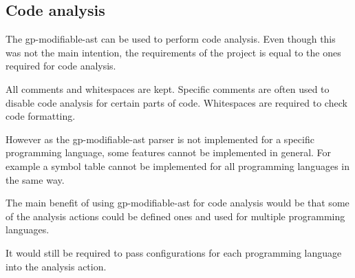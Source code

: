 \subsection{Code analysis}

The gp-modifiable-ast can be used to perform code analysis. Even though this was not the main
intention, the requirements of the project is equal to the ones required for code analysis.

All comments and whitespaces are kept. 
Specific comments are often used to disable code analysis for certain parts of code.
Whitespaces are required to check code formatting.

However as the gp-modifiable-ast parser is not implemented for a specific programming language,
some features cannot be implemented in general. For example a symbol table cannot be implemented
for all programming languages in the same way.

The main benefit of using gp-modifiable-ast for code analysis would be that some of the analysis actions
could be defined ones and used for multiple programming languages.

It would still be required to pass configurations for each programming language into the analysis action.